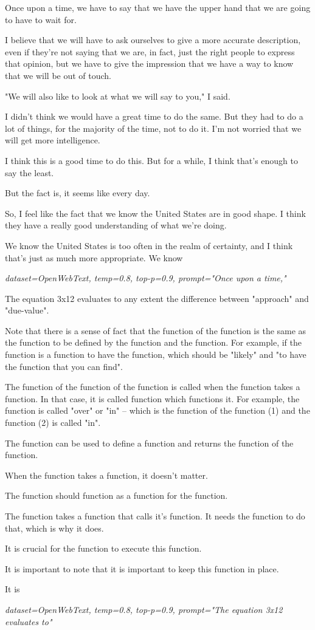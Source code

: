 \documentclass[letterpaper]{article}
\newenvironment{modeloutput}[1]{%
	\begin{mdframed}[backgroundcolor=gray!8, linecolor=gray!60, linewidth=0.8pt,
		innerleftmargin=8pt, innerrightmargin=8pt, innertopmargin=6pt, innerbottommargin=6pt]%
	\small\ttfamily\raggedright
}{%
	\end{mdframed}%
}
\begin{document}
\begin{modeloutput}{}
Once upon a time, we have to say that we have the upper hand that we are going to have to wait for.

I believe that we will have to ask ourselves to give a more accurate description, even if they're not saying that we are, in fact, just the right people to express that opinion, but we have to give the impression that we have a way to know that we will be out of touch.

"We will also like to look at what we will say to you," I said.

I didn't think we would have a great time to do the same. But they had to do a lot of things, for the majority of the time, not to do it. I'm not worried that we will get more intelligence.

I think this is a good time to do this. But for a while, I think that's enough to say the least.

But the fact is, it seems like every day.

So, I feel like the fact that we know the United States are in good shape. I think they have a really good understanding of what we're doing.

We know the United States is too often in the realm of certainty, and I think that's just as much more appropriate. We know
\end{modeloutput}
\noindent\textit{\small dataset=OpenWebText, temp=0.8, top-p=0.9, prompt="Once upon a time,"}

\begin{modeloutput}{}
The equation 3x12 evaluates to any extent the difference between "approach" and "due-value".

Note that there is a sense of fact that the function of the function is the same as the function to be defined by the function and the function. For example, if the function is a function to have the function, which should be "likely" and "to have the function that you can find".

The function of the function of the function is called when the function takes a function. In that case, it is called function which functions it. For example, the function is called "over" or "in" -- which is the function of the function (1) and the function (2) is called "in".

The function can be used to define a function and returns the function of the function.

When the function takes a function, it doesn't matter.

The function should function as a function for the function.

The function takes a function that calls it's function. It needs the function to do that, which is why it does.

It is crucial for the function to execute this function.

It is important to note that it is important to keep this function in place.

It is
\end{modeloutput}
\noindent\textit{\small dataset=OpenWebText, temp=0.8, top-p=0.9, prompt="The equation 3x12 evaluates to"}
\end{document}
